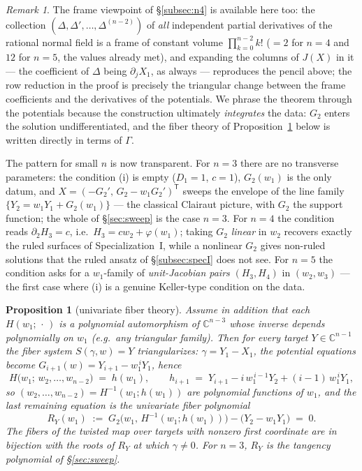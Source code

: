 \documentclass[11pt]{article}
\numberwithin{equation}{section}
\theoremstyle{plain}
\newtheorem{proposition}[theorem]{Proposition}
\theoremstyle{definition}
\theoremstyle{remark}
\newtheorem{remark}[theorem]{Remark}
\newcommand{\C}{\mathbb{C}}
\begin{document}
\begin{remark}
The frame viewpoint of \S\ref{subsec:n4} is available here too: the collection
$(\Delta,\Delta',\dots,\Delta^{(n-2)})$ of \emph{all} independent partial
derivatives of the rational normal field is a frame of constant volume
$\prod_{k=0}^{n-2}k!$ ($=2$ for $n=4$ and $12$ for $n=5$, the values already
met), and expanding the columns of $J(X)$ in it --- the coefficient of
$\Delta$ being $\partial_jX_1$, as always --- reproduces the pencil above; the
row reduction in the proof is precisely the triangular change between the
frame coefficients and the derivatives of the potentials. We phrase the
theorem through the potentials because the construction ultimately
\emph{integrates} the data: $G_2$ enters the solution undifferentiated, and
the fiber theory of Proposition~\ref{prop:curvefib} below is written directly
in terms of $\Gamma$.
\end{remark}

The pattern for small $n$ is now transparent. For $n=3$ there are no
transverse parameters: the condition (i) is empty ($D_1=1$, $c=1$), $G_2(w_1)$
is the only datum, and $X=(-G_2',\,G_2-w_1G_2')^{\mathsf T}$ sweeps the envelope of the
line family $\{Y_2=w_1Y_1+G_2(w_1)\}$ --- the classical Clairaut picture, with
$G_2$ the support function; the whole of \S\ref{sec:sweep} is the case $n=3$.
For $n=4$ the condition reads $\partial_2H_3=c$, i.e.\ $H_3=cw_2+\varphi(w_1)$;
taking $G_2$ \emph{linear} in $w_2$ recovers exactly the ruled surfaces of
Specialization~I, while a nonlinear $G_2$ gives non-ruled solutions that the
ruled ansatz of \S\ref{subsec:specI} does not see. For $n=5$ the condition
asks for a $w_1$-family of \emph{unit-Jacobian pairs}
$(H_3,H_4)$ in $(w_2,w_3)$ --- the first case where (i) is a genuine
Keller-type condition on the data.

\begin{proposition}[univariate fiber theory]\label{prop:curvefib}
Assume in addition that each $H(w_1;\,\cdot\,)$ is a polynomial automorphism
of $\C^{n-3}$ whose inverse depends polynomially on $w_1$ (e.g.\ any
triangular family). Then for every target $Y\in\C^{n-1}$ the fiber system
$S(\gamma,w)=Y$ triangularizes: $\gamma=Y_1-X_1$, the potential equations
become $G_{i+1}(w)=Y_{i+1}-w_1^{\,i}Y_1$, hence
\[
H\bigl(w_1;\,w_2,\dots,w_{n-2}\bigr)\;=\;h(w_1),
\qquad
h_{i+1}\;=\;Y_{i+1}-i\,w_1^{\,i-1}Y_2+(i-1)\,w_1^{\,i}Y_1 ,
\]
so $(w_2,\dots,w_{n-2})=H^{-1}(w_1;h(w_1))$ are polynomial functions of $w_1$,
and the last remaining equation is the univariate \emph{fiber polynomial}
\[
R_Y(w_1)\;:=\;G_2\bigl(w_1,\,H^{-1}(w_1;h(w_1))\bigr)-\bigl(Y_2-w_1Y_1\bigr)
\;=\;0 .
\]
The fibers of the twisted map over targets with nonzero first coordinate are
in bijection with the roots of $R_Y$ at which $\gamma\neq0$. For $n=3$, $R_Y$
is the tangency polynomial of \S\ref{sec:sweep}.
\end{proposition}
\end{document}
